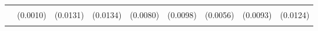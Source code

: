 \begin{table}[!h]
\begin{tabular}[t]{lllllllll}
\addlinespace
\cellcolor{gray!10}{WSLS} & \cellcolor{gray!10}{0.0000} & \cellcolor{gray!10}{0.0178} & \cellcolor{gray!10}{0.0373**} & \cellcolor{gray!10}{0.0118} & \cellcolor{gray!10}{0.0149} & \cellcolor{gray!10}{0.0068} & \cellcolor{gray!10}{0.0084} & \cellcolor{gray!10}{0.0325**}\\
 & (0.0010) & (0.0131) & (0.0134) & (0.0080) & (0.0098) & (0.0056) & (0.0093) & (0.0124)\\
\cellcolor{gray!10}{T2} & \cellcolor{gray!10}{0.1623*} & \cellcolor{gray!10}{0.1630***} & \cellcolor{gray!10}{0.0115} & \cellcolor{gray!10}{0.0923**} & \cellcolor{gray!10}{0.0403} & \cellcolor{gray!10}{0.0885**} & \cellcolor{gray!10}{0.1839***} & \cellcolor{gray!10}{0.1449**}\\
\bottomrule
\end{tabular}
\end{table}